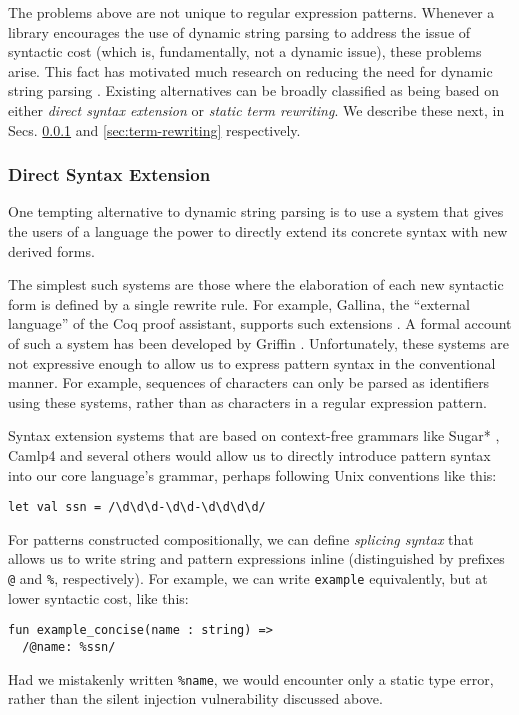 The problems above are not unique to regular expression patterns. Whenever a library encourages the use of dynamic string parsing to address the issue of syntactic cost (which is, fundamentally, not a dynamic issue), these problems arise. %
	This fact has motivated much research on reducing the need for dynamic string parsing \cite{Bravenboer:2007:PIA:1289971.1289975}. Existing alternatives can be broadly classified as being based on either \emph{direct syntax extension} or \emph{static term rewriting}. We describe these next, in Secs. \ref{sec:syntax-extension} and \ref{sec:term-rewriting} respectively.%

\subsubsection{Direct Syntax Extension}\label{sec:syntax-extension}
One tempting alternative to dynamic string parsing is to use a system that gives the users of a language the power to directly extend its concrete syntax with new derived forms. %

The simplest such systems are those where the elaboration of each new syntactic form is defined by a single rewrite rule. For example, Gallina, the ``external language'' of the Coq proof assistant, supports such extensions \cite{Coq:manual}. A formal account of such a system has been developed by Griffin \cite{5134}. Unfortunately, these systems are not expressive enough to allow us to express pattern syntax in the conventional manner. For example, sequences of characters  can only be parsed as identifiers using these systems, rather than as characters in a regular expression pattern. 

Syntax extension systems that are based on context-free grammars like  Sugar* \cite{erdweg2013framework}, Camlp4 \cite{OCaml-manual} and several others would allow us to directly introduce pattern syntax into our core language's grammar, perhaps following Unix conventions like this:
\begin{lstlisting}[numbers=none]
let val ssn = /\d\d\d-\d\d-\d\d\d\d/
\end{lstlisting}

For patterns constructed compositionally, we can define \emph{splicing syntax} that allows us to write string and pattern expressions inline (distinguished by prefixes \lstinline{@} and \lstinline{%}, respectively). 
For example, we can write \lstinline{example} equivalently, but at lower syntactic cost, like this:
\begin{lstlisting}[numbers=none,escapechar=|]
fun example_concise(name : string) => 
  /@name: %ssn/
\end{lstlisting}
Had we mistakenly written \lstinline{%name}, we would encounter only a static type error, rather than the  silent injection  vulnerability discussed above. 

